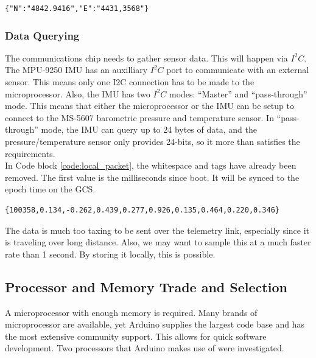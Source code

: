 \documentclass[10pt, a4paper]{article}
\begin{document}
\begin{lstlisting}
{"N":"4842.9416","E":"4431,3568"}
\end{lstlisting}

\subsubsection{Data Querying}

The communications chip needs to gather sensor data. This will happen via $I^2C$. The MPU-9250 IMU\cite{iven} has an auxilliary $I^2C$ port to communicate with an external sensor. This means only one I2C connection has to be made to the microprocessor. Also, the IMU has two $I^2C$ modes: “Master” and “pass-through” mode. This means that either the microprocessor or the IMU can be setup to connect to the MS-5607 barometric pressure and temperature sensor\cite{par}. In “pass-through” mode, the IMU can query up to 24 bytes of data, and the pressure/temperature sensor only provides 24-bits, so it more than satisfies the requirements.\\

In Code block \ref{code:local_packet}, the whitespace and tags have already been removed. The first value is the milliseconds since boot. It will be synced to the epoch time on the GCS. 

\begin{lstlisting}
{100358,0.134,-0.262,0.439,0.277,0.926,0.135,0.464,0.220,0.346}
\end{lstlisting}

The data is much too taxing to be sent over the telemetry link, especially since it is traveling over long distance. Also, we may want to sample this at a much faster rate than 1 second. By storing it locally, this is possible.\\


\subsection{Processor and Memory Trade and Selection}
A microprocessor with enough memory is required. Many brands of microprocessor are available, yet Arduino supplies the largest code base and has the most extensive community support. This allows for quick software development. Two processors that Arduino makes use of were investigated.\\
\end{document}
